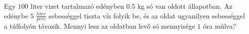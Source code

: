 Egy $100$ liter vizet tartalmazó edényben $0.5$ kg só van oldott
állapotban. Az edénybe 5 $\frac{liter}{perc}$ sebességgel tiszta víz folyik be,
és az oldat ugyanilyen sebességgel a túlfolyón távozik. Mennyi lesz az oldatban
levő só mennyisége $1$ óra múlva?

